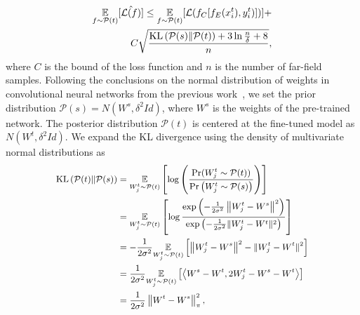 \documentclass{article}
\begin{document}
\begin{equation}
\begin{aligned}
\underset{f \sim \mathcal{P}(t)}{\mathbb{E}}[\hat{\mathcal{L}(f)}] \leq \underset{f \sim \mathcal{P}(t)}{\mathbb{E}}[{\mathcal{L}}(f_C[f_E(x_i^t),y_i^t)])]+ \\ C 
\sqrt{\frac{\operatorname{KL}\left(\mathcal{P}(s) \| \mathcal{P}(t) \right)+3 \ln \frac{n}{\delta}+8}{n}},
\vspace{-2em}%
\end{aligned}
\label{seq2}
\end{equation}
where $C$ is the bound of the loss function and $n$ is the number of far-field samples.
Following the conclusions on the normal distribution of weights in convolutional neural networks from the previous work~\cite{huang2021rethinking}, we set the prior distribution $\mathcal{P}(s)=N(W^s, \delta^{2}Id)$, where $W^s$ is the weights
of the pre-trained network. The posterior distribution $\mathcal{P}(t)$ is centered at the fine-tuned model as
$N (W^t,\delta^2Id)$. %
We expand the KL divergence using the density of multivariate normal distributions as
\begin{equation}
\small
\begin{aligned}
\operatorname{KL}\left(\mathcal{P}(t)\|\mathcal{P}(s)\right) &=\underset{W_j^t \sim \mathcal{P}(t)}{\mathbb{E}}\left[\log \left(\frac{\operatorname{Pr}(W_j^t \sim \mathcal{P}(t))}{\operatorname{Pr}\left(W_j^t \sim \mathcal{P}(s)\right)}\right)\right] \\
&=\underset{W_j^t \sim \mathcal{P}(t)}{\mathbb{E}}\left[\log \frac{\exp \left(-\frac{1}{2 \sigma^2}\left\|W_j^t-W^s\right\|^2\right)}{\exp \left(-\frac{1}{2 \sigma^2}\|W_j^t-W^t\|^2\right)}\right] \\
&=-\frac{1}{2 \sigma^2} \underset{W_j^t \sim \mathcal{P}(t)}{\mathbb{E}}\left[\left\|W_j^t-W^s\right\|^2-\|W_j^t-W^t\|^2\right] \\
&=\frac{1}{2 \sigma^2} \underset{W_j^t \sim \mathcal{P}(t)}{\mathbb{E}}\left[\left\langle W^s-W^t, 2 W_j^t-W^s-W^t\right\rangle\right] \\
&=\frac{1}{2 \sigma^2}\left\|W^t- W^s\right\|_\pi^2, %
\end{aligned}
\label{teq3}
\end{equation}
\end{document}
